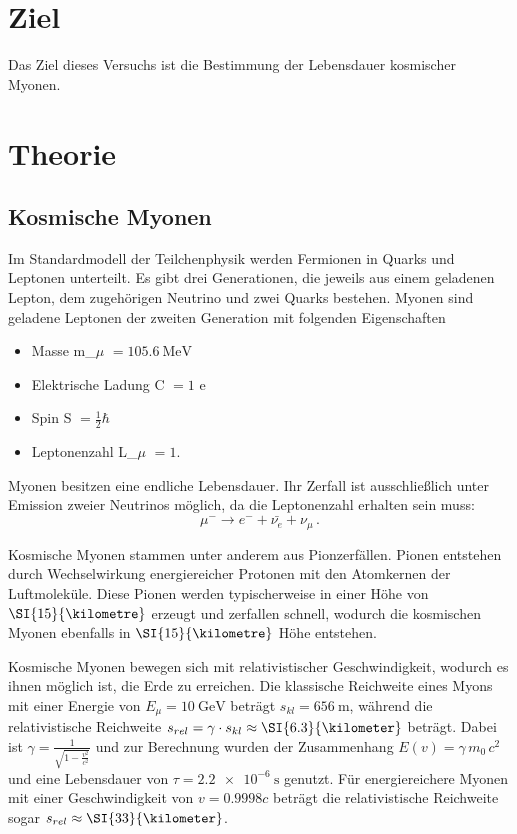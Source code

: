 \section{Ziel}
Das Ziel dieses Versuchs ist die Bestimmung der Lebensdauer kosmischer Myonen.

\section{Theorie}

\subsection{Kosmische Myonen}
Im Standardmodell der Teilchenphysik werden Fermionen in Quarks und Leptonen unterteilt. Es gibt drei Generationen, die jeweils aus einem geladenen Lepton, dem zugehörigen Neutrino und zwei Quarks bestehen. Myonen sind geladene Leptonen der zweiten Generation mit folgenden Eigenschaften
\begin{itemize}
    \item Masse m_{$\mu$} $= \SI{105.6}{\mega\electronvolt}$
    \item Elektrische Ladung C $= 1$ e
    \item Spin S $= \frac{1}{2} \hbar$
    \item Leptonenzahl L_{$\mu$} $= 1$.
\end{itemize}

Myonen besitzen eine endliche Lebensdauer. Ihr Zerfall ist ausschließlich unter Emission zweier Neutrinos möglich, da die Leptonenzahl erhalten sein muss:
\begin{equation*}
    \mu^- \rightarrow e^- + \bar{\nu_{e}} + \nu_{\mu} \, .
\end{equation*}

Kosmische Myonen stammen unter anderem aus Pionzerfällen. Pionen entstehen durch Wechselwirkung energiereicher Protonen mit den Atomkernen der Luftmoleküle. Diese Pionen werden typischerweise in einer Höhe von $\SI{15}{\kilometre}$ erzeugt und zerfallen schnell, wodurch die kosmischen Myonen ebenfalls in $\SI{15}{\kilometre}$ Höhe entstehen. \cite{Grupen}

Kosmische Myonen bewegen sich mit relativistischer Geschwindigkeit, wodurch es ihnen möglich ist, die Erde zu erreichen. Die klassische Reichweite eines Myons mit einer Energie von $E_{\mu} = \SI{10}{\giga\electronvolt}$ beträgt $s_{kl} = \SI{656}{\meter}$, während die relativistische Reichweite $s_{rel} = \gamma \cdot s_{kl} \approx \SI{6.3}{\kilometer}$ beträgt. Dabei ist $\gamma = \frac{1}{\sqrt{1 - \frac{v^2}{c^2}}}$ und zur Berechnung wurden der Zusammenhang $E(v) = \gamma \, m_0 \, c^2$ und eine Lebensdauer von $\tau = \SI{2.2e-6}{\second}$ genutzt. Für energiereichere Myonen mit einer Geschwindigkeit von $v = \num{0.9998} c$ beträgt die relativistische Reichweite sogar $s_{rel} \approx \SI{33}{\kilometer}$.


